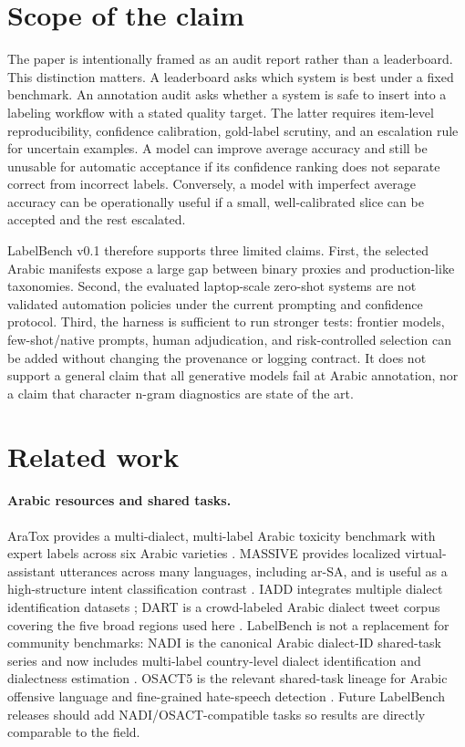 \documentclass[10pt,twocolumn]{article}
\begin{document}
\section{Scope of the claim}
The paper is intentionally framed as an audit report rather than a leaderboard.
This distinction matters. A leaderboard asks which system is best under a
fixed benchmark. An annotation audit asks whether a system is safe to insert
into a labeling workflow with a stated quality target. The latter requires
item-level reproducibility, confidence calibration, gold-label scrutiny, and
an escalation rule for uncertain examples. A model can improve average
accuracy and still be unusable for automatic acceptance if its confidence
ranking does not separate correct from incorrect labels. Conversely, a model
with imperfect average accuracy can be operationally useful if a small,
well-calibrated slice can be accepted and the rest escalated.

LabelBench v0.1 therefore supports three limited claims. First, the selected
Arabic manifests expose a large gap between binary proxies and production-like
taxonomies. Second, the evaluated laptop-scale zero-shot systems are not
validated automation policies under the current prompting and confidence
protocol. Third, the harness is sufficient to run stronger tests: frontier
models, few-shot/native prompts, human adjudication, and risk-controlled
selection can be added without changing the provenance or logging contract.
It does not support a general claim that all generative models fail at Arabic
annotation, nor a claim that character n-gram diagnostics are state of the art.

\section{Related work}
\paragraph{Arabic resources and shared tasks.}
AraTox provides a multi-dialect, multi-label Arabic toxicity benchmark with
expert labels across six Arabic varieties \citep{aratox2026}. MASSIVE provides
localized virtual-assistant utterances across many languages, including
ar-SA, and is useful as a high-structure intent classification contrast
\citep{massive2022}. IADD integrates multiple dialect identification datasets
\citep{iadd2022}; DART is a crowd-labeled Arabic dialect tweet corpus covering
the five broad regions used here \citep{dart2018}. LabelBench is not a
replacement for community benchmarks: NADI is the canonical Arabic dialect-ID
shared-task series and now includes multi-label country-level dialect
identification and dialectness estimation \citep{abdulmageed2024nadi}. OSACT5
is the relevant shared-task lineage for Arabic offensive language and
fine-grained hate-speech detection \citep{mubarak2022osact5}. Future
LabelBench releases should add NADI/OSACT-compatible tasks so results are
directly comparable to the field.
\end{document}
